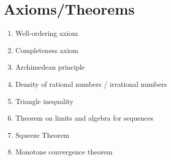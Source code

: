 \documentclass[12pt]{amsart}
\begin{document}
\section*{Axioms/Theorems}

\begin{enumerate}
	\item Well-ordering axiom
	\item Completeness axiom
	\item Archimedean principle
	\item Density of rational numbers / irrational numbers


	\item Triangle inequality

	\item Theorem on limits and algebra for sequences

	\item Squeeze Theorem
	\item Monotone convergence theorem
		\begin{comment}
	\item Principle of induction
					
	\item Theorem on convergence and subsequences
	\item Cantor's Theorem

	\item Bolzano-Weierstrass

	\item Main corollary of Bolzano-Weierstrass
	

	\item Theorem on limits and sequences
	\item Theorem on limits of functions and algebra
	\item Squeeze Theorem for functions


	\item Theorem on continuity and limits
	
	\item Theorem on continuity and algebra
	\item Theorem on continuity and compositions
			\item Intermediate Value Theorem
	\item Boundedness Theorem
	\item Extreme Value Theorem
	

	\item Derivatives and algebra 
		\item Derivatives and minima/maxima
	\item Mean Value Theorem
	\item Increasing/decreasing functions and derivatives
\end{comment}
\end{enumerate}
\end{document}
